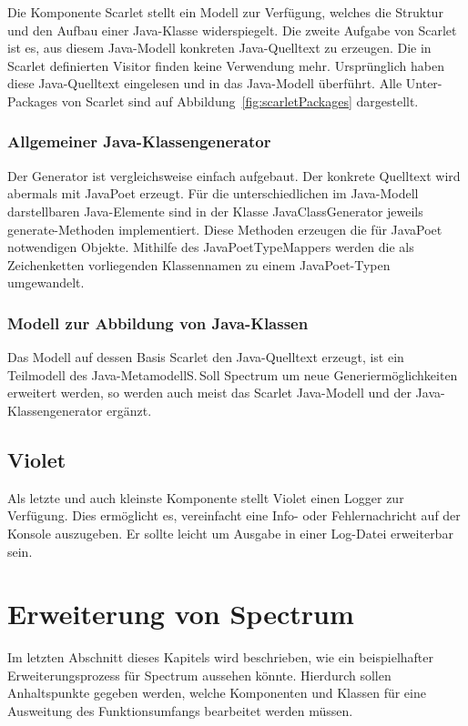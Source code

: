 \documentclass[12pt,oneside,a4paper,parskip]{scrbook}
\begin{document}
Die Komponente Scarlet stellt ein Modell zur Verfügung, welches die Struktur und den Aufbau einer Java-Klasse widerspiegelt. Die zweite Aufgabe von Scarlet ist es, aus diesem Java-Modell konkreten Java-Quelltext zu erzeugen. Die in Scarlet definierten Visitor finden keine Verwendung mehr. Ursprünglich haben diese Java-Quelltext eingelesen und in das Java-Modell überführt. Alle Unter-Packages von Scarlet sind auf Abbildung~\ref{fig:scarletPackages} dargestellt.

\subsubsection{Allgemeiner Java-Klassengenerator}

Der Generator ist vergleichsweise einfach aufgebaut. Der konkrete Quelltext wird abermals mit JavaPoet erzeugt. Für die unterschiedlichen im Java-Modell darstellbaren Java-Elemente sind in der Klasse JavaClassGenerator jeweils generate-Methoden implementiert. Diese Methoden erzeugen die für JavaPoet notwendigen Objekte. Mithilfe des JavaPoetTypeMappers werden die als Zeichenketten vorliegenden Klassennamen zu einem JavaPoet-Typen umgewandelt.

\subsubsection{Modell zur Abbildung von Java-Klassen}

Das Modell auf dessen Basis Scarlet den Java-Quelltext erzeugt, ist ein Teilmodell des Java-MetamodellS.\,Soll Spectrum um neue Generiermöglichkeiten erweitert werden, so werden auch meist das Scarlet Java-Modell und der Java-Klassengenerator ergänzt.

\subsection{Violet}

Als letzte und auch kleinste Komponente stellt Violet einen Logger zur Verfügung. Dies ermöglicht es, vereinfacht eine Info- oder Fehlernachricht auf der Konsole auszugeben. Er sollte leicht um Ausgabe in einer Log-Datei erweiterbar sein.

\section{Erweiterung von Spectrum}

Im letzten Abschnitt dieses Kapitels wird beschrieben, wie ein beispielhafter Erweiterungsprozess für Spectrum aussehen könnte. Hierdurch sollen Anhaltspunkte gegeben werden, welche Komponenten und Klassen für eine Ausweitung des Funktionsumfangs bearbeitet werden müssen.
\end{document}
